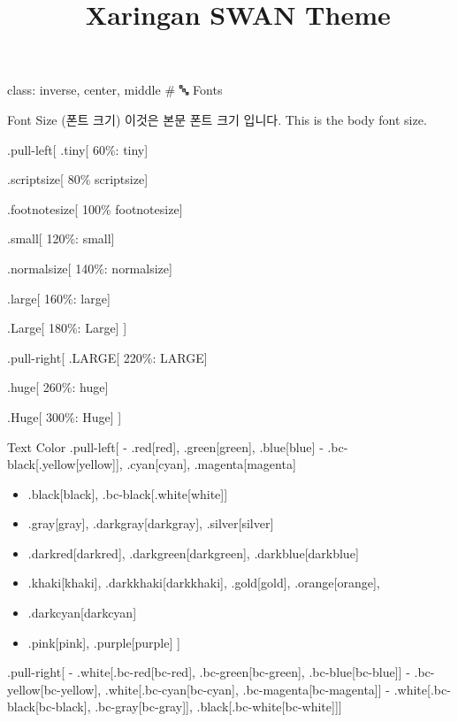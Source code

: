 \documentclass[
  ignorenonframetext,
]{beamer}
\title{🦢 Xaringan SWAN Theme}
\author{}
\date{\vspace{-2.5em}}
\begin{document}
\frame{\titlepage}

\begin{frame}
class: inverse, center, middle \# 🔤 Fonts
\end{frame}

\begin{frame}{Font Size (폰트 크기)}
\protect\hypertarget{font-size-uxd3f0uxd2b8-uxd06cuxae30}{}
이것은 본문 폰트 크기 입니다. This is the body font size.

.pull-left{[} .tiny{[} 60\%: tiny{]}

.scriptsize{[} 80\% scriptsize{]}

.footnotesize{[} 100\% footnotesize{]}

.small{[} 120\%: small{]}

.normalsize{[} 140\%: normalsize{]}

.large{[} 160\%: large{]}

.Large{[} 180\%: Large{]} {]}

.pull-right{[} .LARGE{[} 220\%: LARGE{]}

.huge{[} 260\%: huge{]}

.Huge{[} 300\%: Huge{]} {]}
\end{frame}

\begin{frame}{Text Color}
\protect\hypertarget{text-color}{}
.pull-left{[} - .red{[}red{]}, .green{[}green{]}, .blue{[}blue{]} -
.bc-black{[}.yellow{[}yellow{]}{]}, .cyan{[}cyan{]},
.magenta{[}magenta{]}

\begin{itemize}
\item
  .black{[}black{]}, .bc-black{[}.white{[}white{]}{]}
\item
  .gray{[}gray{]}, .darkgray{[}darkgray{]}, .silver{[}silver{]}
\item
  .darkred{[}darkred{]}, .darkgreen{[}darkgreen{]},
  .darkblue{[}darkblue{]}
\item
  .khaki{[}khaki{]}, .darkkhaki{[}darkkhaki{]}, .gold{[}gold{]},
  .orange{[}orange{]},
\item
  .darkcyan{[}darkcyan{]}
\item
  .pink{[}pink{]}, .purple{[}purple{]} {]}
\end{itemize}

.pull-right{[} - .white{[}.bc-red{[}bc-red{]}, .bc-green{[}bc-green{]},
.bc-blue{[}bc-blue{]}{]} - .bc-yellow{[}bc-yellow{]},
.white{[}.bc-cyan{[}bc-cyan{]}, .bc-magenta{[}bc-magenta{]}{]} -
.white{[}.bc-black{[}bc-black{]}, .bc-gray{[}bc-gray{]}{]},
.black{[}.bc-white{[}bc-white{]}{]}{]}
\end{frame}
\end{document}
